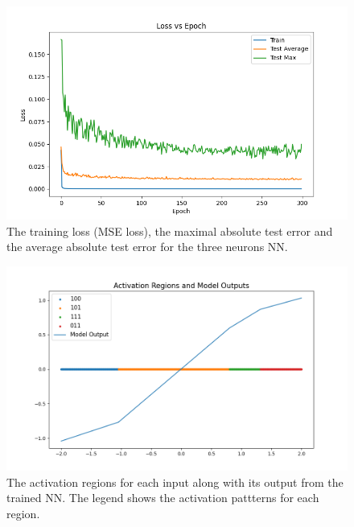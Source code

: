 \documentclass[
	12pt, %
]{../Template/fphw}
\begin{document}
\begin{figure}[!htbp]
    \centering
    \includegraphics[width=\linewidth]{HW1/q2a.png}
    \caption{The training loss (MSE loss), the maximal absolute test error and the average absolute test error for the three neurons NN.}
    \label{fig: q2a}
\end{figure}

\begin{figure}[!htbp]
    \centering
    \includegraphics[width=\linewidth]{HW1/q2b.png}
    \caption{The activation regions for each input along with its output from the trained NN. The legend shows the activation pattterns for each region.}
    \label{fig: q2b}
\end{figure}
\end{document}
